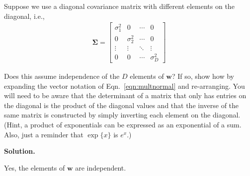 \documentclass[10pt]{article}
\begin{document}
\begin{itemize}
Suppose we use a diagonal covariance matrix with different elements on the diagonal, i.e.,
\begin{eqnarray*}
\mathbf{\Sigma} = 
\begin{bmatrix}
\sigma_1^2 & 0 & \cdots & 0 \\
0 & \sigma_2^2 & \cdots & 0 \\
\vdots & \vdots & \ddots & \vdots \\
0 & 0 & \cdots & \sigma_D^2
\end{bmatrix}
\end{eqnarray*}

Does this assume independence of the $D$ elements of $\mathbf{w}$?  If so, show how by expanding the vector notation of Eqn.~\ref{eqn:multnormal} and re-arranging.  You will need to be aware that the determinant of a matrix that only has entries on the diagonal is the product of the diagonal values and that the inverse of the same matrix is constructed by simply inverting each element on the diagonal.  (Hint, a product of exponentials can be expressed as an exponential of a sum.  Also, just a reminder that $\exp\{x\}$ is $e^x$.)

{\bf Solution.}

Yes, the elements of $\mathbf{w}$ are independent.


\end{itemize}
\end{document}
